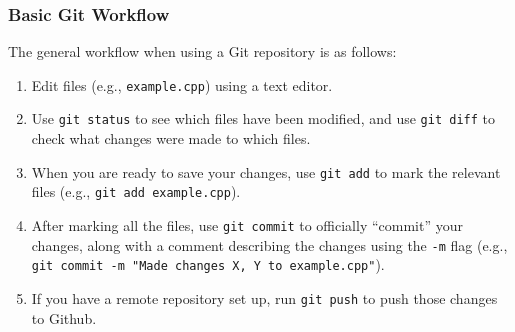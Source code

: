 \documentclass[12pt]{article}
\begin{document}
\subsubsection{Basic Git Workflow}
The general workflow when using a Git repository is as follows:
\begin{enumerate}
    \item Edit files (e.g., \texttt{example.cpp}) using a text editor.
    \item Use \texttt{git status} to see which files have been modified, and use \texttt{git diff} to check what changes were made to which files.
    \item When you are ready to save your changes, use \texttt{git add} to mark the relevant files (e.g., \texttt{git add example.cpp}).
    \item After marking all the files, use \texttt{git commit} to officially ``commit'' your changes, along with a comment describing the changes using the \texttt{-m} flag (e.g., \texttt{git commit -m "Made changes X, Y to example.cpp"}).
    \item If you have a remote repository set up, run \texttt{git push} to push those changes to Github.
\end{enumerate}
\end{document}
